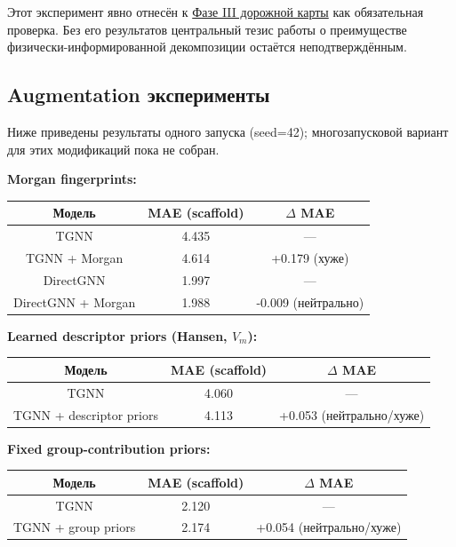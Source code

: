 \documentclass[11pt]{article}
\begin{document}
Этот эксперимент явно отнесён к \hyperref[subsec:roadmap-phase3]{Фазе III дорожной карты} как обязательная проверка. Без его результатов центральный тезис работы о преимуществе физически-информированной декомпозиции остаётся неподтверждённым.

\subsection{Augmentation эксперименты}

Ниже приведены результаты одного запуска (seed=42); многозапусковой вариант для этих модификаций пока не собран.

\textbf{Morgan fingerprints:}

\begin{center}
\begin{tabular}{|c|c|c|}
\hline
Модель & MAE (scaffold) & $\Delta$ MAE \\
\hline
TGNN & 4.435 & --- \\
\hline
TGNN + Morgan & 4.614 & +0.179 (хуже) \\
\hline
DirectGNN & 1.997 & --- \\
\hline
DirectGNN + Morgan & 1.988 & -0.009 (нейтрально) \\
\hline
\end{tabular}
\end{center}

\textbf{Learned descriptor priors (Hansen, $V_m$):}

\begin{center}
\begin{tabular}{|c|c|c|}
\hline
Модель & MAE (scaffold) & $\Delta$ MAE \\
\hline
TGNN & 4.060 & --- \\
\hline
TGNN + descriptor priors & 4.113 & +0.053 (нейтрально/хуже) \\
\hline
\end{tabular}
\end{center}

\textbf{Fixed group-contribution priors:}

\begin{center}
\begin{tabular}{|c|c|c|}
\hline
Модель & MAE (scaffold) & $\Delta$ MAE \\
\hline
TGNN & 2.120 & --- \\
\hline
TGNN + group priors & 2.174 & +0.054 (нейтрально/хуже) \\
\hline
\end{tabular}
\end{center}
\end{document}
